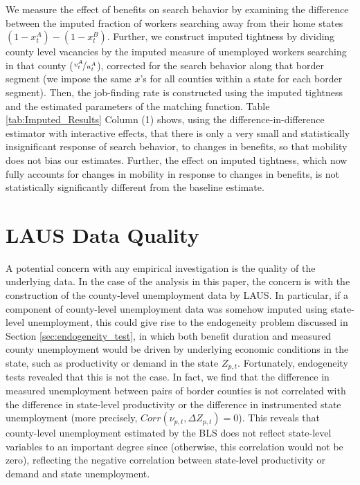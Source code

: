 \documentclass[12pt]{article}
\newcommand{\1}{\mathbf{1}}
\newcommand{\vat}{v^A_t}
\newcommand{\xat}{x^A_t}
\newcommand{\xbt}{x^B_t}
\newcommand{\uat}{u^A_t}
\begin{document}
\begin{appendix}
We measure the effect of benefits on search behavior by examining the difference between the imputed fraction of workers searching away from their home states $(1-\xat)-(1-\xbt)$.  Further, we construct imputed tightness by dividing county level vacancies by the imputed measure of unemployed workers searching in that county ($\nicefrac{\vat}{\uat}$), corrected for the search behavior along that border segment (we impose the same $x$'s for all counties within a state for each border segment).  Then, the job-finding rate is constructed using the imputed tightness and the estimated parameters of the matching function.    Table \ref{tab:Imputed_Results} Column (1) shows, using the difference-in-difference estimator with interactive effects, that there is only a very small and statistically insignificant response of search behavior, to changes in benefits, so that mobility does not bias our estimates.   Further, the effect on imputed tightness, which now fully accounts for changes in mobility in response to changes in benefits, is not statistically significantly different from the baseline estimate. %



\section{LAUS Data Quality}
\label{app:data_quality}
A potential concern with any empirical investigation is the quality of the underlying data. In the case of the analysis in this paper, the concern is with the construction of the county-level unemployment data by LAUS. In particular, if a component of county-level unemployment data was somehow imputed using state-level unemployment, this could give rise to the endogeneity problem discussed in Section \ref{sec:endogeneity_test}, in which both benefit duration and measured county unemployment would be driven by underlying economic conditions in the state, such as productivity or demand in the state $Z_{p,t}$. Fortunately, endogeneity tests revealed that this is not the case. In fact, we find that the difference in measured unemployment between pairs of border counties is not correlated with the difference in state-level productivity or the difference in instrumented state unemployment (more precisely, $Corr (\nu_{p,t}, \Delta Z_{p,t}) = 0$). This reveals that county-level unemployment estimated by the BLS does not reflect state-level variables to an important degree since (otherwise, this correlation would not be zero), reflecting the negative correlation between state-level productivity or demand and state unemployment.




\end{appendix}
\end{document}
